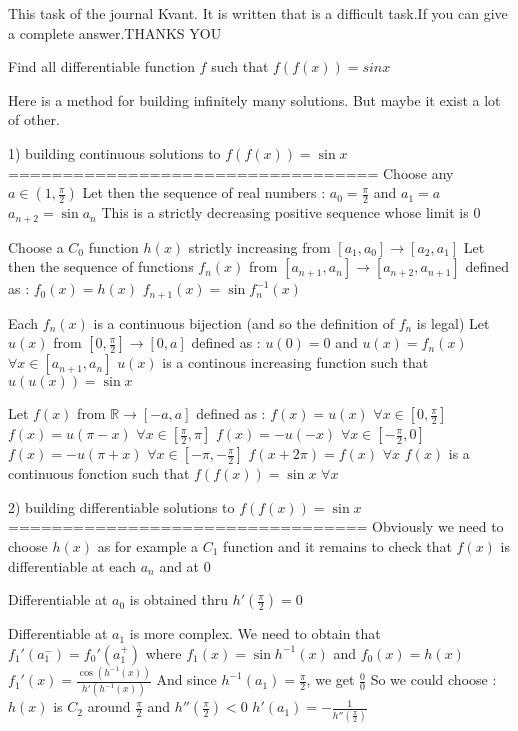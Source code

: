 \begin{solution}
	This task of the journal Kvant. It is written that is a difficult task.If you can give a complete answer.THANKS YOU
\end{solution}



\begin{solution}
	\begin{tcolorbox}Find all differentiable function $f$ such that $f(f(x))=sinx$
\end{tcolorbox}
Here is a method for building infinitely many solutions. But maybe it exist a lot of other.

1) building continuous solutions to $f(f(x))=\sin x$
==================================
Choose any $a\in(1,\frac{\pi}2)$ 
Let then the sequence of real numbers : $a_0=\frac{\pi}2$ and $a_1=a$ $a_{n+2}=\sin a_n$
This is a strictly decreasing positive sequence whose limit is $0$

Choose a  $C_0$ function $h(x)$ strictly increasing from $[a_1,a_0]\to[a_2,a_1]$
Let then the sequence of functions $f_n(x)$ from $[a_{n+1},a_n]\to[a_{n+2},a_{n+1}]$ defined as :
$f_0(x)=h(x)$
$f_{n+1}(x)=\sin f_n^{-1}(x)$

Each $f_n(x)$ is a continuous bijection (and so the definition of $f_n$ is legal)
Let $u(x)$ from $[0,\frac{\pi}2]\to[0,a]$ defined as :
$u(0)=0$ and $u(x)=f_n(x)$ $\forall x\in [a_{n+1},a_n]$ 
$u(x)$ is a continous increasing function such that $u(u(x))=\sin x$

Let $f(x)$ from $\mathbb R\to[-a,a]$ defined as :
$f(x)=u(x)$ $\forall x\in[0,\frac{\pi}2]$
$f(x)=u(\pi-x)$ $\forall x\in[\frac{\pi}2,\pi]$
$f(x)=-u(-x)$ $\forall x\in[-\frac{\pi}2,0]$
$f(x)=-u(\pi+x)$ $\forall x\in[-\pi,-\frac{\pi}2]$
$f(x+2\pi)=f(x)$ $\forall x$
$f(x)$ is a continuous fonction such that $f(f(x))=\sin x$ $\forall x$

2) building differentiable solutions to $f(f(x))=\sin x$
=================================
Obviously we need to choose $h(x)$ as for example a $C_1$ function and it remains to check that $f(x)$ is differentiable at each $a_n$ and at $0$

Differentiable at $a_0$ is obtained thru $h'(\frac{\pi}2)=0$

Differentiable at $a_1$ is more complex.
We need to obtain that $f_1'(a_1^-)=f_0'(a_1^+)$ where $f_1(x)=\sin h^{-1}(x)$ and $f_0(x)=h(x)$
$f_1'(x)=\frac{\cos(h^{-1}(x))}{h'(h^{-1}(x))}$
And since $h^{-1}(a_1)=\frac{\pi}2$, we get $\frac 00$
So we could choose :
$h(x)$ is $C_2$ around $\frac{\pi}2$ and $h''(\frac{\pi}2)< 0$
$h'(a_1)=-\frac 1{h''(\frac{\pi}2)}$


\end{solution}
